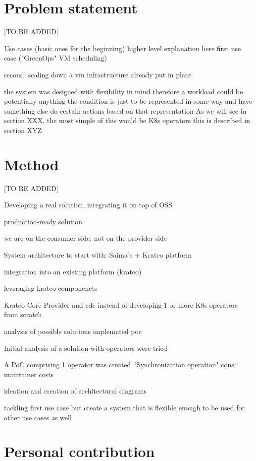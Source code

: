 \section{Problem statement}
\label{sec:problem}

[TO BE ADDED]

Use cases (basic ones for the beginning) higher level explanation here
first use case ("GreenOps" VM scheduling)

second: scaling down a vm 
infrastructure already put in place

the system was designed with flexibility in mind therefore a workload could be potentially anything
the condition is just to be represented in some way and have something else do certain actions based on that representation
As we will see in section XXX, the most simple of this would be K8s operators
this is described in section XYZ

\section{Method}

[TO BE ADDED]

Developing a real solution, integrating it on top of OSS

production-ready solution

we are on the consumer side, not on the provider side

System architecture to start with: Saima's + Krateo platform

integration into an existing platform (krateo)

leveraging krateo componenets

Krateo Core Provider and cdc instead of developing 1 or more K8s operators from scratch


analysis of possible solutions
implemnted poc 

Initial analysis of a solution with operators were tried

A PoC comprising 1 operator was created 
``Synchronization operation"
cons: maintainer costs

ideation and creation of architectural diagrams

tackling first use case
but create a system that is flexible enough to be used for other use cases as well

\section{Personal contribution}

